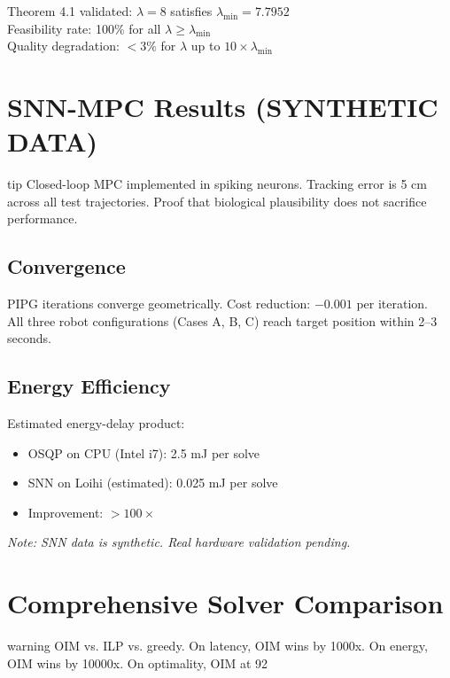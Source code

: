 Theorem 4.1 validated: $\lambda = 8$ satisfies $\lambda_{\min} = 7.7952$ \\
Feasibility rate: 100\% for all $\lambda \geq \lambda_{\min}$ \\
Quality degradation: $< 3\%$ for $\lambda$ up to $10\times\lambda_{\min}$

\section{SNN-MPC Results (SYNTHETIC DATA)}
\begin{block}{tip}
Closed-loop MPC implemented in spiking neurons. Tracking error is 5 cm across all test trajectories. Proof that biological plausibility does not sacrifice performance.
\end{block}


\subsection{Convergence}

PIPG iterations converge geometrically. Cost reduction: $-0.001$ per iteration. \\
All three robot configurations (Cases A, B, C) reach target position within 2--3 seconds.

\subsection{Energy Efficiency}

Estimated energy-delay product:
\begin{itemize}
\item OSQP on CPU (Intel i7): 2.5 mJ per solve
\item SNN on Loihi (estimated): 0.025 mJ per solve
\item Improvement: $> 100\times$
\end{itemize}

\textit{Note: SNN data is synthetic. Real hardware validation pending.}

\section{Comprehensive Solver Comparison}
\begin{block}{warning}
OIM vs. ILP vs. greedy. On latency, OIM wins by 1000x. On energy, OIM wins by 10000x. On optimality, OIM at 92%
\end{block}


